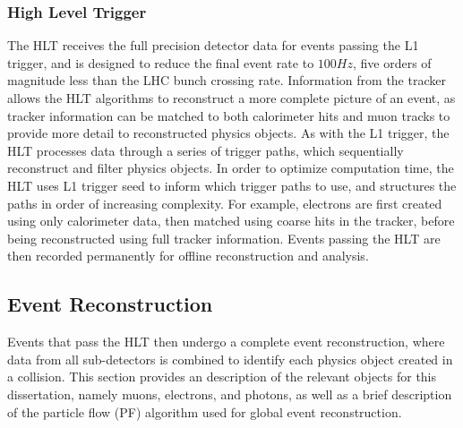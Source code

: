 \subsubsection{High Level Trigger} \label{sec:CMS_HLT}
The HLT receives the full precision detector data for events passing the L1 trigger, and is designed to reduce the final event rate to $100\unit{Hz}$, five orders of magnitude less than the LHC bunch crossing rate. Information from the tracker allows the HLT algorithms to reconstruct a more complete picture of an event, as tracker information can be matched to both calorimeter hits and muon tracks to provide more detail to reconstructed physics objects. As with the L1 trigger, the HLT processes data through a series of trigger paths, which sequentially reconstruct and filter physics objects. In order to optimize computation time, the HLT uses L1 trigger seed to inform which trigger paths to use, and structures the paths in order of increasing complexity. For example, electrons are first created using only calorimeter data, then matched using coarse hits in the tracker, before being reconstructed using full tracker information. Events passing the HLT are then recorded permanently for offline reconstruction and analysis. 

\subsection{Event Reconstruction} \label{sec:CMS_Reco}
Events that pass the HLT then undergo a complete event reconstruction, where data from all sub-detectors is combined to identify each physics object created in a collision. This section provides an description of the relevant objects for this dissertation, namely muons, electrons, and photons, as well as a brief description of the particle flow (PF) algorithm used for global event reconstruction.

